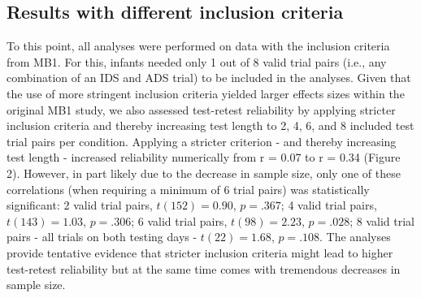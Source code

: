 \documentclass[
  man,floatsintext]{apa6}
\begin{document}
\hypertarget{results-with-different-inclusion-criteria}{%
\subsection{Results with different inclusion criteria}\label{results-with-different-inclusion-criteria}}

To this point, all analyses were performed on data with the inclusion criteria from MB1. For this, infants needed only 1 out of 8 valid trial pairs (i.e., any combination of an IDS and ADS trial) to be included in the analyses. Given that the use of more stringent inclusion criteria yielded larger effects sizes within the original MB1 study, we also assessed test-retest reliability by applying stricter inclusion criteria and thereby increasing test length to 2, 4, 6, and 8 included test trial pairs per condition. Applying a stricter criterion - and thereby increasing test length - increased reliability numerically from r = 0.07 to r = 0.34 (Figure 2). However, in part likely due to the decrease in sample size, only one of these correlations (when requiring a minimum of 6 trial pairs) was statistically significant: 2 valid trial pairs, \(t(152) = 0.90\), \(p = .367\); 4 valid trial pairs, \(t(143) = 1.03\), \(p = .306\); 6 valid trial pairs, \(t(98) = 2.23\), \(p = .028\); 8 valid trial pairs - all trials on both testing days - \(t(22) = 1.68\), \(p = .108\). The analyses provide tentative evidence that stricter inclusion criteria might lead to higher test-retest reliability but at the same time comes with tremendous decreases in sample size.
\end{document}
